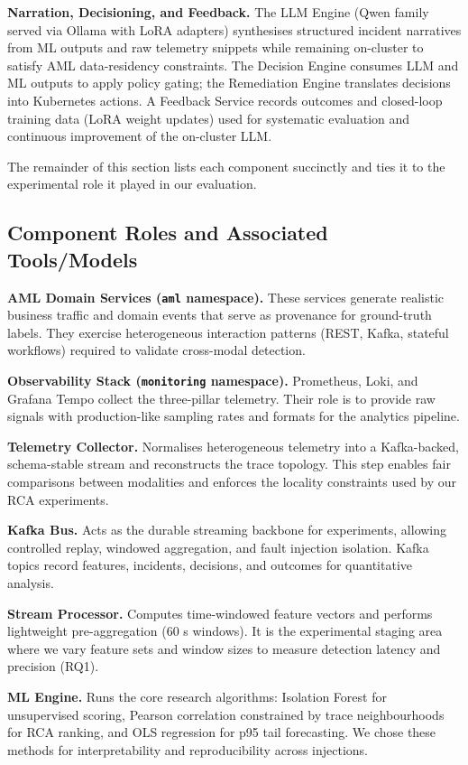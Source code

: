 \documentclass[a4paper]{lipics-v2021}
\newcommand{\mypara}[1]{{\vspace{0.1mm}\noindent\textbf{#1}}}
\begin{document}
\mypara{Narration, Decisioning, and Feedback.}
The LLM Engine (Qwen family served via Ollama with LoRA adapters) synthesises
structured incident narratives from ML outputs and raw telemetry snippets while
remaining on-cluster to satisfy AML data-residency constraints. The Decision
Engine consumes LLM and ML outputs to apply policy gating; the Remediation
Engine translates decisions into Kubernetes actions. A Feedback Service records
outcomes and closed-loop training data (LoRA weight updates) used for
systematic evaluation and continuous improvement of the on-cluster LLM.

The remainder of this section lists each component succinctly and ties it to
the experimental role it played in our evaluation.

\subsection{Component Roles and Associated Tools/Models}

\mypara{AML Domain Services (\texttt{aml} namespace).} These services generate
realistic business traffic and domain events that serve as provenance for
ground-truth labels. They exercise heterogeneous interaction patterns (REST,
Kafka, stateful workflows) required to validate cross-modal detection.

\mypara{Observability Stack (\texttt{monitoring} namespace).} Prometheus,
Loki, and Grafana Tempo collect the three-pillar telemetry. Their role is to
provide raw signals with production-like sampling rates and formats for the
analytics pipeline.

\mypara{Telemetry Collector.} Normalises heterogeneous telemetry into a
Kafka-backed, schema-stable stream and reconstructs the trace topology. This
step enables fair comparisons between modalities and enforces the locality
constraints used by our RCA experiments.

\mypara{Kafka Bus.} Acts as the durable streaming backbone for experiments,
allowing controlled replay, windowed aggregation, and fault injection
isolation. Kafka topics record features, incidents, decisions, and outcomes for
quantitative analysis.

\mypara{Stream Processor.} Computes time-windowed feature vectors and performs
lightweight pre-aggregation (60 s windows). It is the experimental staging area
where we vary feature sets and window sizes to measure detection latency and
precision (RQ1).

\mypara{ML Engine.} Runs the core research algorithms: Isolation Forest for
unsupervised scoring, Pearson correlation constrained by trace neighbourhoods
for RCA ranking, and OLS regression for p95 tail forecasting. We chose these
methods for interpretability and reproducibility across injections.
\end{document}
